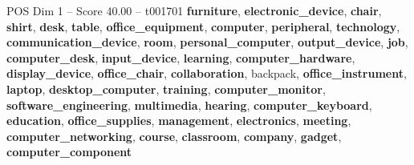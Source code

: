 \begin{textsample}{POS Dim 1 – Score 40.00 – t001701}  \label{ex:f1_pos_004}
\textbf{furniture}, \textbf{electronic\_device}, \textbf{chair}, \textbf{shirt}, \textbf{desk}, \textbf{table}, \textbf{office\_equipment}, \textbf{computer}, \textbf{peripheral}, \textbf{technology}, \textbf{communication\_device}, \textbf{room}, \textbf{personal\_computer}, \textbf{output\_device}, \textbf{job}, \textbf{computer\_desk}, \textbf{input\_device}, \textbf{learning}, \textbf{computer\_hardware}, \textbf{display\_device}, \textbf{office\_chair}, \textbf{collaboration}, backpack, \textbf{office\_instrument}, \textbf{laptop}, \textbf{desktop\_computer}, \textbf{training}, \textbf{computer\_monitor}, \textbf{software\_engineering}, \textbf{multimedia}, \textbf{hearing}, \textbf{computer\_keyboard}, \textbf{education}, \textbf{office\_supplies}, \textbf{management}, \textbf{electronics}, \textbf{meeting}, \textbf{computer\_networking}, \textbf{course}, \textbf{classroom}, \textbf{company}, \textbf{gadget}, \textbf{computer\_component}

\end{textsample}
